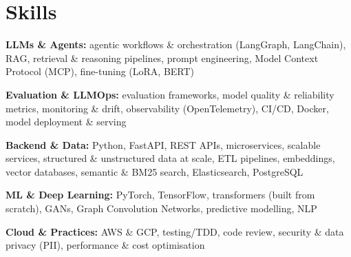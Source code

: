 \documentclass[10pt,a4paper]{article}
\begin{document}
\section{Skills}
\begin{tight}
  \item[\textcolor{accent}{\small$\bullet$}] \textbf{LLMs \& Agents:} agentic workflows \& orchestration (LangGraph, LangChain), RAG, retrieval \& reasoning pipelines, prompt engineering, Model Context Protocol (MCP), fine-tuning (LoRA, BERT)
  \item[\textcolor{accent}{\small$\bullet$}] \textbf{Evaluation \& LLMOps:} evaluation frameworks, model quality \& reliability metrics, monitoring \& drift, observability (OpenTelemetry), CI/CD, Docker, model deployment \& serving
  \item[\textcolor{accent}{\small$\bullet$}] \textbf{Backend \& Data:} Python, FastAPI, REST APIs, microservices, scalable services, structured \& unstructured data at scale, ETL pipelines, embeddings, vector databases, semantic \& BM25 search, Elasticsearch, PostgreSQL
  \item[\textcolor{accent}{\small$\bullet$}] \textbf{ML \& Deep Learning:} PyTorch, TensorFlow, transformers (built from scratch), GANs, Graph Convolution Networks, predictive modelling, NLP
  \item[\textcolor{accent}{\small$\bullet$}] \textbf{Cloud \& Practices:} AWS \& GCP, testing/TDD, code review, security \& data privacy (PII), performance \& cost optimisation
\end{tight}

\end{document}
